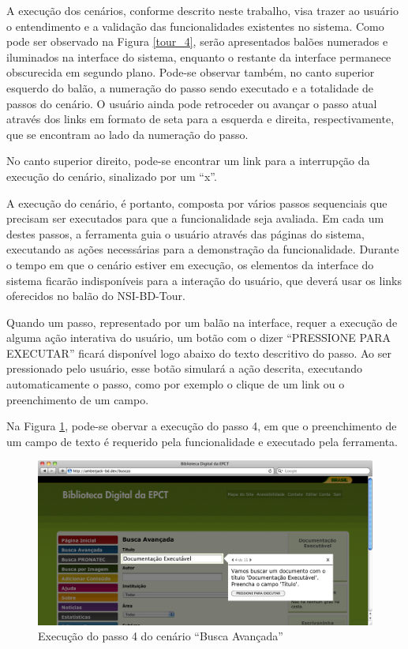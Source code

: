 A execução dos cenários, conforme descrito neste trabalho, visa trazer ao usuário o entendimento e a validação das funcionalidades existentes no sistema. Como pode ser observado na Figura \ref{tour_4}, serão apresentados balões numerados e iluminados na interface do sistema, enquanto o restante da interface permanece obscurecida em segundo plano. Pode-se observar também, no canto superior esquerdo do balão, a numeração do passo sendo executado e a totalidade de passos do cenário. O usuário ainda pode retroceder ou avançar o passo atual através dos links em formato de seta para a esquerda e direita, respectivamente, que se encontram ao lado da numeração do passo.

No canto superior direito, pode-se encontrar um link para a interrupção da execução do cenário, sinalizado por um “x”.

A execução do cenário, é portanto, composta por vários passos sequenciais que precisam ser executados para que a funcionalidade seja avaliada. Em cada um destes passos, a ferramenta guia o usuário através das páginas do sistema, executando as ações necessárias para a demonstração da funcionalidade. Durante o tempo em que o cenário estiver em execução, os elementos da interface do sistema ficarão indisponíveis para a interação do usuário, que deverá usar os links oferecidos no balão do NSI-BD-Tour.

Quando um passo, representado por um balão na interface, requer a execução de alguma ação interativa do usuário, um botão com o dizer “PRESSIONE PARA EXECUTAR” ficará disponível logo abaixo do texto descritivo do passo. Ao ser pressionado pelo usuário, esse botão simulará a ação descrita, executando automaticamente o passo, como por exemplo o clique de um link ou o preenchimento de um campo.

Na Figura \ref{tour_5}, pode-se obervar a execução do passo 4, em que o preenchimento de um campo de texto é requerido pela funcionalidade e executado pela ferramenta.

\begin{figure}[ht]
    \centering
    \includegraphics[width=0.9 \textwidth]{figuras/tour_5}
    \caption{Execução do passo 4 do cenário “Busca Avançada”}
    \label{tour_5}
\end{figure}

